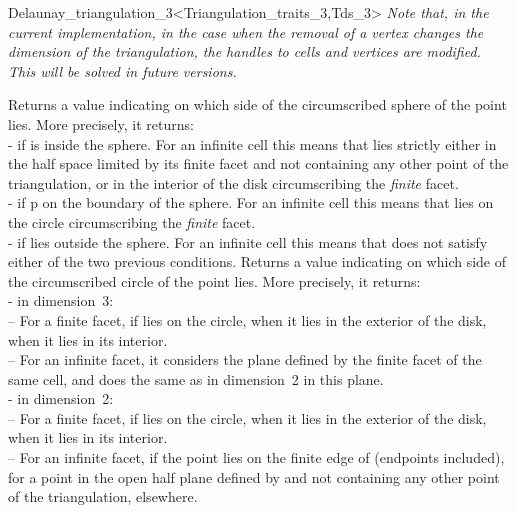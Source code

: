\begin{ccRefClass}{Delaunay_triangulation_3<Triangulation_traits_3,Tds_3>}
\textit{Note that, in the current implementation, in the case when the
removal of a vertex changes the dimension of the triangulation, the
handles to cells and vertices are modified. This will be solved in
future versions.} 


{Returns a value indicating on which side of the circumscribed sphere
of  the point  lies. More precisely, it returns:\\
-  if  is inside the sphere. For an infinite
cell this means that  lies strictly either in the half space
limited by its finite facet and not containing any other point of the
triangulation, or in the interior of the disk circumscribing the
\textit{finite} facet. \\ 
-  if p on the boundary of the sphere. For an infinite
cell this means that  lies on the circle circumscribing
the \textit{finite} facet.\\ 
-  if  lies outside the sphere. For an
infinite cell this means that  does not satisfy either of the
two previous conditions. 
}
{Returns a value indicating on which side of the circumscribed circle
of  the point  lies. More precisely, it returns:\\
- in dimension~3:\\
-- For a finite facet,  if  lies
on the circle,  when it lies in the exterior of
the disk,  when it lies in its interior.\\
-- For an infinite facet, it considers the plane defined by the finite
facet of the same cell, and does the same as in dimension~2 in this
plane.\\
- in dimension~2:\\
-- For a finite facet,  if  lies
on the circle,  when it lies in the exterior of
the disk,  when it lies in its interior.\\
-- For an infinite facet,  if the
point lies on the finite edge of  (endpoints included),
 for a point in the open half plane defined
by  and not containing any other point of the triangulation,
 elsewhere. 
}


\end{ccRefClass}
